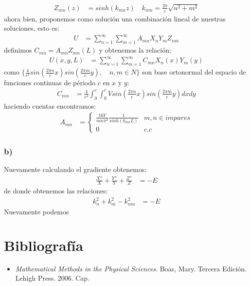 \documentclass{article}
\begin{document}
\begin{tcolorbox}[breakable]
\begin{align*}
        Z_{nm}(z) &= sinh(k_{mn}z)
        \quad k_{nm} = \frac{2\pi}{c} \sqrt{ n^2 + m^2 } 
    \end{align*}
    ahora bien, proponemos como solución una combinación lineal de nuestras soluciones, esto es:
    \begin{align*}
        U 
        &=\sum_{n=1}^\infty \sum_{m=1}^\infty A_{mn}X_nY_mZ_{nm}
    \end{align*}
    definimos $C_{mn} = A_{mn}Z_{mn}(L)$ y obtenemos la relación:
    \begin{align*}
        U(x,y,L) 
        &=\sum_{n=1}^\infty \sum_{m=1}^\infty C_{mn}X_n(x)Y_m(y)
    \end{align*}
    como $\{\frac{4}{c^2}sin(\frac{2\pi n}{c}x)sin(\frac{2\pi m}{c}y),\quad n,m \in N\}$ son base ortonormal del espacio 
    de funciones continuas de périodo $c$ en $x$ y $y$:
    \begin{align*}
        C_{mn} &= \frac{4}{c^2} \int_0^c\int_0^c Vsin\left(\frac{2\pi n}{c}x\right)sin\left(\frac{2\pi m}{c}y\right)dxdy
    \end{align*}
    haciendo cuentas encontramos:
    \begin{align*}
        A_{mn} &= 
        \begin{cases}
        \frac{16V}{mn\pi^2}\frac{1}{sinh(k_{mn}L)} & m,n \in impares \\
        0 &c.c    
        \end{cases}
    \end{align*}
    \subsubsection*{b)}
    Nuevamente calculando el gradiente obtenemos:
    \begin{align*}
        \frac{X''}{X} + \frac{Y''}{Y} + \frac{Z''}{Z} &= -E
    \end{align*}
    de donde obtenemos las relaciones:
    \begin{align*}
        k_n^2 + k_m^2 - k_{nm}^2 &= -E
    \end{align*}
    Nuevamente podemos 
\end{tcolorbox}
\section*{Bibliografía}
\begin{itemize}
    \item \textit{Mathematical Methods in the Physical Sciences}. Boas, Mary. Tercera Edición. Lehigh Press. 2006. Cap.
\end{itemize}
\end{document}
